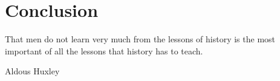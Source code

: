 
\section{Conclusion}
\label{ch:conclusion}

\epigraph{That men do not learn very much from the lessons of history is the most important of all the lessons that history has to teach.}{Aldous Huxley}


\cleardoublepage